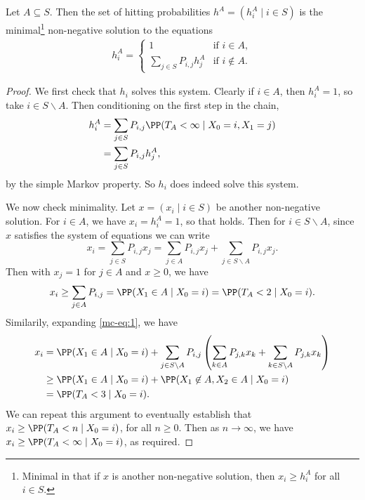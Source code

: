 \documentclass[a4paper]{scrartcl}
\begin{document}
\begin{theorem}
	Let $A \subseteq S$. Then the set of hitting probabilities $h^A = (h_i^A \mid i \in S)$ is the minimal\footnote{Minimal in that if $x$ is another non-negative solution, then $x_i \geq h_i^A$ for all $i \in S$.} non-negative solution to the equations
	\begin{align*}
		h_i^A = \begin{cases}
			1 &\mbox{if } i  \in A, \\
			\sum_{j \in S} P_{i, j} h_j^A &\mbox{if } i \not \in A.
		   \end{cases}
	\end{align*}
\end{theorem}
\begin{proof}
	We first check that $h_i$ solves this system. Clearly if $i \in A$, then $h_i^A = 1$, so take $i \in S\backslash A$. Then conditioning on the first step in the chain,
	\begin{align*}
		h_i^A &= \sum_{j \in S} P_{i, j} \PP(T_A < \infty \mid X_0 = i, X_1 = j)  \\
		&= \sum_{j \in S} P_{i, j} h_j^A,
	\end{align*}
	by the simple Markov property. So $h_i$ does indeed solve this system.

	We now check minimality. Let $x = (x_i \mid i \in S)$ be another non-negative solution. For $i \in A$, we have $x_i = h^A_i = 1$, so that holds. Then for $i \in S \backslash A$, since $x$ satisfies the system of equations we can write
	\begin{equation}\label{mc-eq:1}
		x_i = \sum_{j \in S}P_{i, j} x_j = \sum_{j \in A} P_{i, j} x_j + \sum_{j \in S \backslash A} P_{i, j} x_j. \tag{$\dagger$}
	\end{equation}
	Then with $x_j = 1$ for $j \in A$ and $x \geq 0$, we have
	\begin{align*}
		x_i \geq \sum_{j \in A} P_{i, j} = \PP(X_1 \in A \mid X_0 = i) = \PP(T_A < 2 \mid X_0 = i).
	\end{align*}
	Similarily, expanding \eqref{mc-eq:1}, we have
	\begin{align*}
	x_i &= \PP(X_1 \in A \mid X_0 = i) + \sum_{j \in S \backslash A} P_{i, j} \left(\sum_{k \in A} P_{j, k} x_k + \sum_{k \in S \backslash A} P_{j, k} x_k\right) \\
		&\geq \PP(X_1 \in A \mid X_0 = i) + \PP(X_1 \not \in A, X_2 \in A \mid X_0 = i) \\
		&= \PP(T_A < 3 \mid X_0 = i).
	\end{align*}
	We can repeat this argument to eventually establish that $x_i \geq \PP(T_A < n \mid X_0 = i)$, for all $n \geq 0$. Then as $n \rightarrow \infty$, we have $x_i \geq \PP(T_A < \infty \mid X_0 = i)$, as required.
\end{proof}
\end{document}
